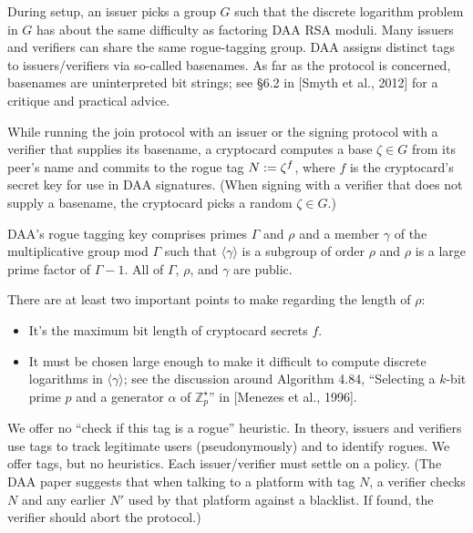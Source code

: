 During setup, an issuer picks a group $G$ such that the discrete
logarithm problem in $G$ has about the same difficulty as
factoring DAA RSA moduli.
Many issuers and verifiers can share the same rogue-tagging
group. DAA assigns distinct tags to issuers/verifiers via
so-called basenames. As far as the protocol is concerned,
basenames are uninterpreted bit strings; see \S\/6.2 in [Smyth et
al., 2012] for a critique and practical advice.

While running the join protocol with an issuer or the signing
protocol with a verifier that supplies its basename, a
cryptocard computes a base $\zeta \in G$ from its peer's name and
commits to the rogue tag $N \mathrel{:=} \zeta^f$, where $f$ is the cryptocard's
secret key for use in DAA signatures. (When signing with a
verifier that does not supply a basename, the cryptocard picks
a random $\zeta \in G$.)

\newcommand{\Z}{\mathbb{Z}}
\newcommand{\N}{\mathbb{N}}
\newcommand{\Zstar}[1]{\Z^{\star}_{#1}}
\newcommand{\gen}[1]{\langle{#1}\rangle}

\medskip

DAA's rogue tagging key comprises primes $\Gamma$ and $\rho$ and a member $\gamma$
of the multiplicative group mod $\Gamma$ such that $\gen\gamma$ is a subgroup of order $\rho$ and $\rho$ is a
large prime factor of $\Gamma - 1$.
All of $\Gamma$, $\rho$, and $\gamma$ are public.

There are at least two important points to make regarding the length of $\rho$:
\begin{itemize}

\item It's the maximum bit length of cryptocard secrets $f$.

\item It must be chosen large enough to make it difficult to
compute discrete logarithms in $\gen\gamma$; see the discussion around
Algorithm 4.84, ``Selecting a $k$-bit prime $p$ and a generator $\alpha$
of $\Zstar p$'' in [Menezes et al., 1996].

\end{itemize}

We offer no “check if this tag is a rogue” heuristic. In
theory, issuers and verifiers use tags to track legitimate
users (pseudonymously) and to identify rogues. We offer tags,
but no heuristics. Each issuer/verifier must settle on a
policy. (The DAA paper suggests that when talking to a
platform with tag $N$, a verifier checks $N$ and any earlier $N'$
used by that platform against a blacklist. If found, the
verifier should abort the protocol.)

